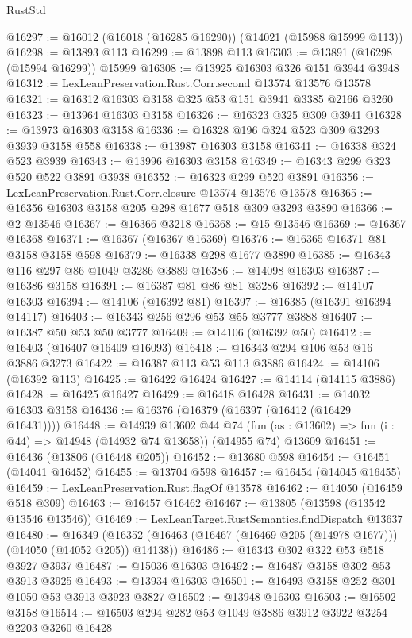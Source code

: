\begin{lexlean}{RustStd}
\begin{coremodule}
@16297 := @16012 (@16018 (@16285 @16290)) (@14021 (@15988 @15999 @113))
@16298 := @13893 @113
@16299 := @13898 @113
@16303 := @13891 (@16298 (@15994 @16299)) @15999
@16308 := @13925 @16303 @326 @151 @3944 @3948
@16312 := LexLeanPreservation.Rust.Corr.second @13574 @13576 @13578
@16321 := @16312 @16303 @3158 @325 @53 @151 @3941 @3385 @2166 @3260
@16323 := @13964 @16303 @3158
@16326 := @16323 @325 @309 @3941
@16328 := @13973 @16303 @3158
@16336 := @16328 @196 @324 @523 @309 @3293 @3939 @3158 @558
@16338 := @13987 @16303 @3158
@16341 := @16338 @324 @523 @3939
@16343 := @13996 @16303 @3158
@16349 := @16343 @299 @323 @520 @522 @3891 @3938
@16352 := @16323 @299 @520 @3891
@16356 := LexLeanPreservation.Rust.Corr.closure @13574 @13576 @13578
@16365 := @16356 @16303 @3158 @205 @298 @1677 @518 @309 @3293 @3890
@16366 := @2 @13546
@16367 := @16366 @3218
@16368 := @15 @13546
@16369 := @16367 @16368
@16371 := @16367 (@16367 @16369)
@16376 := @16365 @16371 @81 @3158 @3158 @598
@16379 := @16338 @298 @1677 @3890
@16385 := @16343 @116 @297 @86 @1049 @3286 @3889
@16386 := @14098 @16303
@16387 := @16386 @3158
@16391 := @16387 @81 @86 @81 @3286
@16392 := @14107 @16303
@16394 := @14106 (@16392 @81)
@16397 := @16385 (@16391 @16394 @14117)
@16403 := @16343 @256 @296 @53 @55 @3777 @3888
@16407 := @16387 @50 @53 @50 @3777
@16409 := @14106 (@16392 @50)
@16412 := @16403 (@16407 @16409 @16093)
@16418 := @16343 @294 @106 @53 @16 @3886 @3273
@16422 := @16387 @113 @53 @113 @3886
@16424 := @14106 (@16392 @113)
@16425 := @16422 @16424
@16427 := @14114 (@14115 @3886)
@16428 := @16425 @16427
@16429 := @16418 @16428
@16431 := @14032 @16303 @3158
@16436 := @16376 (@16379 (@16397 (@16412 (@16429 @16431))))
@16448 := @14939
    @13602
    @44
    @74
    (fun (as : @13602) => fun (i : @44) => @14948 (@14932 @74 @13658))
    (@14955 @74)
    @13609
@16451 := @16436 (@13806 (@16448 @205))
@16452 := @13680 @598
@16454 := @16451 (@14041 @16452)
@16455 := @13704 @598
@16457 := @16454 (@14045 @16455)
@16459 := LexLeanPreservation.Rust.flagOf @13578
@16462 := @14050 (@16459 @518 @309)
@16463 := @16457 @16462
@16467 := @13805 (@13598 (@13542 @13546 @13546))
@16469 := LexLeanTarget.RustSemantics.findDispatch @13637
@16480 := @16349
    (@16352 (@16463 (@16467 (@16469 @205 (@14978 @1677))) (@14050 (@14052 @205)) @14138))
@16486 := @16343 @302 @322 @53 @518 @3927 @3937
@16487 := @15036 @16303
@16492 := @16487 @3158 @302 @53 @3913 @3925
@16493 := @13934 @16303
@16501 := @16493 @3158 @252 @301 @1050 @53 @3913 @3923 @3827
@16502 := @13948 @16303
@16503 := @16502 @3158
@16514 := @16503 @294 @282 @53 @1049 @3886 @3912 @3922 @3254 @2203 @3260 @16428

\end{coremodule}
\end{lexlean}
